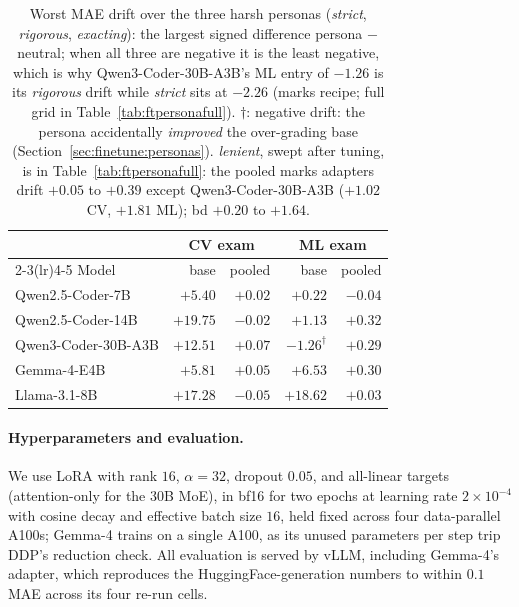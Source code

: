 \begin{table}[t]
\centering
\caption{Worst MAE drift over the three harsh personas (\emph{strict}, \emph{rigorous}, \emph{exacting}): the largest signed difference persona $-$ neutral; when all three are negative it is the least negative, which is why Qwen3-Coder-$30$B-A$3$B's ML entry of $-1.26$ is its \emph{rigorous} drift while \emph{strict} sits at $-2.26$ (marks recipe; full grid in Table~\ref{tab:ftpersonafull}). $\dagger$: negative drift: the persona accidentally \emph{improved} the over-grading base (Section~\ref{sec:finetune:personas}). \emph{lenient}, swept after tuning, is in Table~\ref{tab:ftpersonafull}: the pooled marks adapters drift $+0.05$ to $+0.39$ except Qwen3-Coder-$30$B-A$3$B ($+1.02$ CV, $+1.81$ ML); bd $+0.20$ to $+1.64$.}
\label{tab:ftpersona}
\small
\begin{tabular}{lrrrr}
\toprule
& \multicolumn{2}{c}{CV exam} & \multicolumn{2}{c}{ML exam} \\
\cmidrule(lr){2-3}\cmidrule(lr){4-5}
Model & base & pooled & base & pooled \\
\midrule
Qwen2.5-Coder-7B    & $+5.40$  & $+0.02$ & $+0.22$  & $-0.04$ \\
Qwen2.5-Coder-14B   & $+19.75$ & $-0.02$ & $+1.13$  & $+0.32$ \\
Qwen3-Coder-30B-A3B & $+12.51$ & $+0.07$ & $-1.26^\dagger$ & $+0.29$ \\
Gemma-4-E4B         & $+5.81$  & $+0.05$ & $+6.53$  & $+0.30$ \\
Llama-3.1-8B        & $+17.28$ & $-0.05$ & $+18.62$ & $+0.03$ \\
\bottomrule
\end{tabular}
\end{table}

\paragraph{Hyperparameters and evaluation.}
We use LoRA with rank $16$, $\alpha = 32$, dropout $0.05$, and all-linear targets (attention-only for the $30$B MoE), in bf16 for two epochs at learning rate $2\times10^{-4}$ with cosine decay and effective batch size $16$, held fixed across four data-parallel A100s; Gemma-4 trains on a single A100, as its unused parameters per step trip DDP's reduction check. All evaluation is served by vLLM, including Gemma-4's adapter, which reproduces the HuggingFace-generation numbers to within $0.1$ MAE across its four re-run cells.

